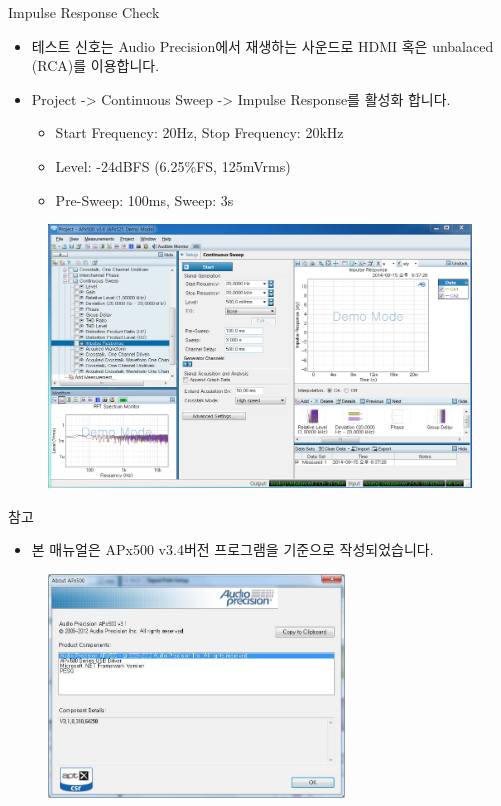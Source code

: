 \documentclass{beamer}
\begin{document}
\begin{frame}[t]{Impulse Response Check}
\begin{itemize}
\item 테스트 신호는 Audio Precision에서 재생하는 사운드로 HDMI 혹은 unbalaced (RCA)를 이용합니다.
\item Project -> Continuous Sweep -> Impulse Response를 활성화 합니다.
	\begin{itemize}
	\item Start Frequency: 20Hz, Stop Frequency: 20kHz
	\item Level: -24dBFS (6.25\%FS, 125mVrms)
	\item Pre-Sweep: 100ms, Sweep: 3s
	\end{itemize}
\end{itemize}

\begin{figure}[r]
\includegraphics[height=0.4\textwidth]{figure/apsetting/impulseResponse.png}
\end{figure}

\end{frame}


\begin{frame}[t]{참고}
	\begin{itemize}
	\item 본 매뉴얼은 APx500 v3.4버전 프로그램을 기준으로 작성되었습니다.
	\end{itemize}

	\begin{figure}
		\begin{center}
		\includegraphics[width=0.7\textwidth]{figure/ap/about_apx500.jpg}
		\end{center}
	\end{figure}
\end{frame}
\end{document}
